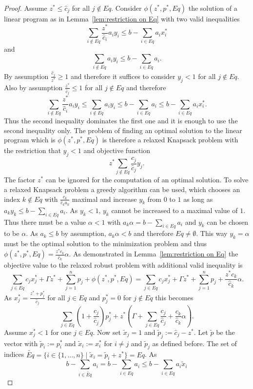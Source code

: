 \documentclass[titlepage, a4paper]{amsbook}
\theoremstyle{plain}
\theoremstyle{break}
\theoremstyle{definition}
\theoremstyle{remark}
\numberwithin{equation}{thm}
\begin{document}
\begin{proof}
Assume $z^* \leq \hat{c}_j$ for all $j \notin Eq$. Consider 
$\phi(z^*, p^*, Eq)$ the solution of a linear program as in Lemma~\ref{lem:restriction on Eq} with two valid inequalities
\[\sum_{i \notin Eq} \frac{z^*}{\hat{c}_i}a_iy_i \leq b - \sum_{i \in Eq}a_i x^*_i\]
and 
\[\sum_{i \notin Eq}a_iy_i \leq b - \sum_{i \in Eq}a_i.\]
By assumption $\frac{\hat{c}_j}{z^*} \geq 1$ and therefore it suffices to consider $y_j < 1$ for all $j \notin Eq$. Also by assumption $\frac{z^*}{\hat{c}_j} \leq 1$ for all $j \notin Eq$ and therefore 
\[\sum_{i \notin Eq} \frac{z^*}{\hat{c}_i}a_iy_i \leq \sum_{i \notin Eq} a_iy_i \leq b - \sum_{i \in Eq}a_i \leq b - \sum_{i \in Eq}a_i x^*_i.\]
Thus the second inequality dominates the first one and it is enough to use the second inequality only. The problem of finding an optimal solution to the linear program which is $\phi(z^*,p^*,Eq)$ is therefore a relaxed Knapsack problem with the restriction that $y_j < 1$ and objective function 
\[z^*\sum_{j \notin Eq} \frac{c_j}{\hat{c}_j}y_j.\]
The factor $z^*$ can be ignored for the computation of an optimal solution. To solve a relaxed Knapsack problem a greedy algorithm can be used, which chooses an index $k \notin Eq$ with $\frac{c_k}{\hat{c}_k a_k}$ maximal and increase $y_k$ from $0$ to $1$ as long as $a_k y_k \leq b - \sum_{i \in Eq}a_i$. As $y_k < 1$, $y_k$ cannot be increased to a maximal value of $1$. Thus there must be a value $\alpha < 1$ with $a_k \alpha = b- \sum_{i \in Eq}a_i$ and $y_k$ can be chosen to be $\alpha$. As $a_k \leq b$ by assumption, $a_k \alpha < b$ and therefore $Eq \neq \emptyset$. This way $y_k=\alpha$ must be the optimal solution to the minimization problem and thus $\phi(z^*,p^*,Eq)=\frac{z^*c_k}{\hat{c}_k}\alpha$. As demonstrated in Lemma~\ref{lem:restriction on Eq} the objective value to the relaxed robust problem with additional valid inequality 
is 
\[\sum_{j \in Eq}c_jx^*_j + \Gamma z^* + \sum_{j=1}^np_j + \phi(z^*, p^*, Eq)  = \sum_{j \in Eq}c_jx^*_j + \Gamma z^* + \sum_{j=1}^np_j +\frac{z^*c_k}{\hat{c}_k}\alpha.\]
As $x^*_j=\frac{z^* + p^*_j}{\hat{c}_j}$ for all $j \in Eq$ and $p^*_j=0$ for $j \notin Eq$ this becomes
\[\sum_{j \in Eq} (1+\frac{c_j}{\hat{c}_j})p^*_j + z^*(\Gamma + \sum_{j \in Eq}\frac{c_j}{\hat{c}_j} + \frac{c_k}{\hat{c}_k}\alpha).\]
Assume $x^*_j < 1$ for one $j \in Eq$. Now set $\tilde{x}_j=1$ and $\tilde{p}_j := \hat{c}_j-z^*$. Let $\tilde{p}$ be the vector with $\tilde{p}_i:=p^*_i$ and $\tilde{x}_i:=x^*_i$ for $i \neq j$ and $\tilde{p}_j$ as defined before. The set of indices $\widetilde{Eq}=\{i \in \{1, \ldots, n\} \mid \tilde{x}_i=\tilde{p}_i + z^*\}=Eq$. As  \[b - \sum_{i \in \widetilde{Eq}}a_i = b - \sum_{i \in Eq}a_i \leq b - \sum_{i \in Eq}a_i\tilde{x}_i\]

\end{proof}
\end{document}
